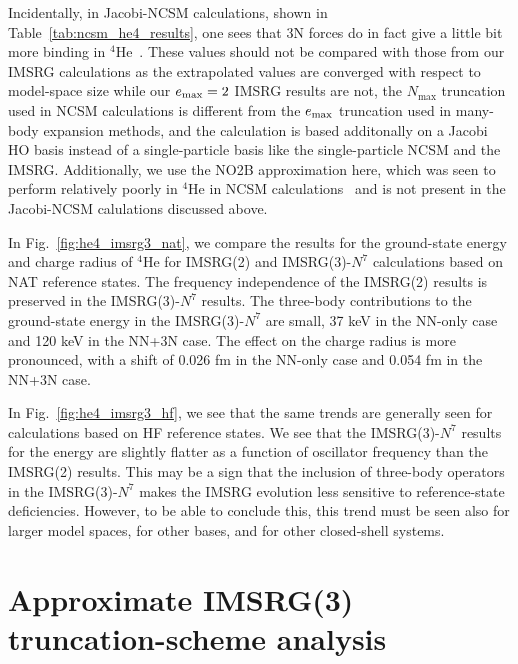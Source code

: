 Incidentally,
in Jacobi-NCSM calculations, shown in Table~\ref{tab:ncsm_he4_results},
one sees that 3N forces do in fact
give a little bit more binding in ${}^{4}\text{He}$~\cite{Hebe20jac_nscm_he4}.
These values should not be compared with those from our IMSRG calculations
as the extrapolated values are converged with respect to model-space size
while our $e_{\text{max}}=2$ IMSRG results are not,
the $N_{\text{max}}$ truncation used in NCSM calculations
is different from the $e_{\text{max}}$ truncation used in many-body expansion methods,
and the calculation is based additonally on a Jacobi HO basis
instead of a single-particle basis like the single-particle NCSM and the IMSRG.
Additionally,
we use the NO2B approximation here,
which was seen to perform relatively poorly in ${}^{4}\text{He}$
in NCSM calculations~\cite{Roth11nonb_approx}
and is not present in the Jacobi-NCSM calulations discussed above.

In Fig.~\ref{fig:he4_imsrg3_nat},
we compare the results for
the ground-state energy and charge radius of ${}^{4}\text{He}$
for IMSRG(2) and IMSRG(3)-$N^7$ calculations
based on NAT reference states.
The frequency independence of the IMSRG(2) results
is preserved in the IMSRG(3)-$N^7$ results.
The three-body contributions to the ground-state energy
in the IMSRG(3)-$N^7$ are small,
37 keV in the NN-only case
and 120 keV in the NN+3N case.
The effect on the charge radius is more pronounced,
with a shift of 0.026 fm in the NN-only case
and 0.054 fm in the NN+3N case.

In Fig.~\ref{fig:he4_imsrg3_hf},
we see that the same trends are generally seen
for calculations based on HF reference states.
We see that the IMSRG(3)-$N^7$ results
for the energy are slightly flatter
as a function of oscillator frequency
than the IMSRG(2) results.
This may be a sign that the inclusion of three-body operators
in the IMSRG(3)-$N^7$ makes the IMSRG evolution
less sensitive to reference-state deficiencies.
However, to be able to conclude this,
this trend must be seen also for larger model spaces,
for other bases,
and for other closed-shell systems.


\section{Approximate IMSRG(3) truncation-scheme analysis}

